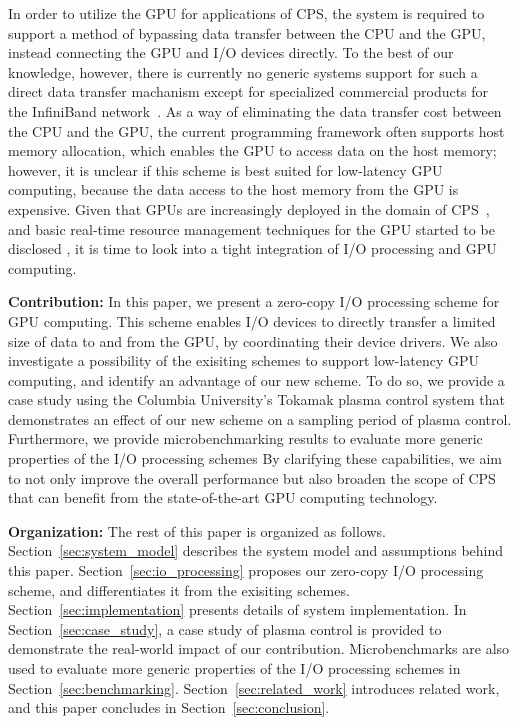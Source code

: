 In order to utilize the GPU for applications of CPS, the system is
required to support a method of bypassing data transfer between the CPU
and the GPU, instead connecting the GPU and I/O devices directly.
To the best of our knowledge, however, there is currently no generic
systems support for such a direct data transfer machanism except for
specialized commercial products for the InfiniBand
network~\cite{GPUDirect}.
As a way of eliminating the data transfer cost between the CPU and the
GPU, the current programming framework often supports host memory
allocation, which enables the GPU to access data on the host memory;
however, it is unclear if this scheme is best suited for low-latency GPU
computing, because the data access to the host memory from the GPU is
expensive.
Given that GPUs are increasingly deployed in the domain of
CPS~\cite{Hirabayashi_REACTION12, Mangharam11, McNaughton_ICRA11,
Michel_IROS07}, 
and basic real-time resource management techniques for the GPU started to be
disclosed \cite{Elliott_RTS12, Elliott_ECRTS12, Kato_RTAS11,
Kato_RTSS11, Kato_ATC11, Kato_ATC12, Liu_PACT12}, it is time to look
into a tight integration of I/O processing and GPU computing.

\textbf{Contribution:}
In this paper, we present a zero-copy I/O processing scheme for GPU
computing.
This scheme enables I/O devices to directly transfer a limited size of
data to and from the GPU, by coordinating their device drivers. 
We also investigate a possibility of the exisiting schemes to support
low-latency GPU computing, and identify an advantage of our new scheme.
To do so, we provide a case study using the Columbia University's
Tokamak plasma control system that demonstrates an effect of our
new scheme on a sampling period of plasma control.
Furthermore, we provide microbenchmarking results to evaluate more
generic properties of the I/O processing schemes
By clarifying these capabilities, we aim to not only improve the overall
performance but also broaden the scope of CPS that can benefit from the
state-of-the-art GPU computing technology.

\textbf{Organization:}
The rest of this paper is organized as follows.
Section~\ref{sec:system_model} describes the system model and
assumptions behind this paper.
Section~\ref{sec:io_processing} proposes our zero-copy I/O processing
scheme, and differentiates it from the exisiting schemes.
Section~\ref{sec:implementation} presents details of system
implementation.
In Section~\ref{sec:case_study}, a case study of plasma control is
provided to demonstrate the real-world impact of our contribution.
Microbenchmarks are also used to evaluate more generic properties of the
I/O processing schemes in Section~\ref{sec:benchmarking}.
Section~\ref{sec:related_work} introduces related work, and this paper
concludes in Section~\ref{sec:conclusion}.